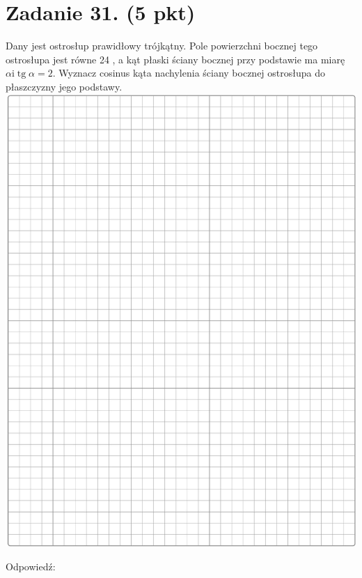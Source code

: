 \documentclass[10pt]{article}
\begin{document}
\section*{Zadanie 31. (5 pkt)}
Dany jest ostrosłup prawidłowy trójkątny. Pole powierzchni bocznej tego ostrosłupa jest równe 24 , a kąt płaski ściany bocznej przy podstawie ma miarę \(\alpha \mathrm{i} \operatorname{tg} \alpha=2\). Wyznacz cosinus kąta nachylenia ściany bocznej ostrosłupa do płaszczyzny jego podstawy.\\
\includegraphics[max width=\textwidth, center]{2024_11_21_a38d702bc7be8115942cg-12}

Odpowiedź:
\end{document}
